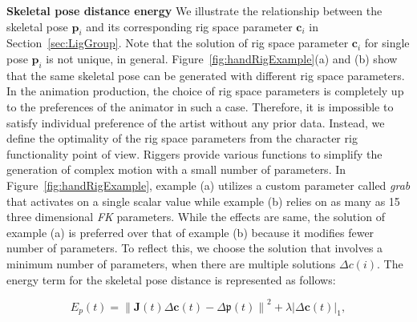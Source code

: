 \textbf{Skeletal pose distance energy}
We illustrate the relationship between the skeletal pose $\mathbf{p}_i$ and its corresponding rig space parameter $\mathbf{c}_i$ in Section~\ref{sec:LigGroup}. Note that the solution of rig space parameter $\mathbf{c}_i$ for single pose $\mathbf{p}_i$ is not unique, in general. Figure~\ref{fig:handRigExample}(a) and (b) show that the same skeletal pose can be generated with different rig space parameters. In the animation production, the choice of rig space parameters is completely up to the preferences of the animator in such a case. Therefore, it is impossible to satisfy individual preference of the artist without any prior data. 
Instead, we define the optimality of the rig space parameters from the character rig functionality point of view. Riggers provide various functions to simplify the generation of complex motion with a small number of parameters\cite{orvalho2012facial}. In Figure~\ref{fig:handRigExample}, example (a) utilizes a custom parameter called \textit{grab} that activates on a single scalar value while example (b) relies on as many as 15 three dimensional \textit{FK} parameters. While the effects are same, the solution of example (a) is preferred over that of example (b) because it modifies fewer number of parameters. 
To reflect this, we choose the solution that involves a minimum number of parameters, when there are multiple solutions $\Delta{c(i)}$.
The energy term for the skeletal pose distance is represented as follows:

\begin{equation}
E_{p}(t) = \left \| \mathbf{J}(t)\Delta \mathbf{c}(t)-\Delta \mathfrak{p}(t) \right \|^{2}+\lambda \left | \Delta \mathbf{c}(t) \right |_1,
\end{equation}

